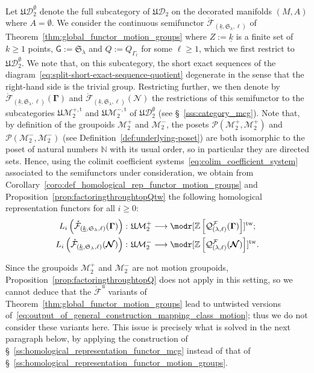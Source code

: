 \documentclass[AHL,Unicode,published]{cedram}
\newcommand{\Int}{\mathring}
\newcommand{\tw}{\mathrm{tw}}
\newcommand{\mt}{\mathrm{t}}
\newcommand{\unt}{\mathrm{u}}
\newcommand{\MCGo}{\mathbf{\Gamma}}
\newcommand{\MCGno}{\boldsymbol{\mathcal{N}}}
\newcommand{\LCS}{\varGamma}
\newcommand{\Sym}{\mathfrak{S}}
\newcommand{\fU}{\ensuremath{\mathfrak{U}}}
\newcommand{\sG}{\mathsf{G}}
\newcommand{\cD}{\mathcal{D}}
\newcommand{\cF}{\mathcal{F}}
\newcommand{\cM}{\mathcal{M}}
\newcommand{\cP}{\mathcal{P}}
\newcommand{\cQ}{\mathcal{Q}}
\newcommand{\bN}{\mathbb{N}}
\newcommand{\bZ}{\mathbb{Z}}
\newcommand{\too}{\ensuremath{\longrightarrow}}
\renewcommand{\geq}{\geqslant}
\begin{document}
Let $\fU\cD_{2}^{\emptyset}$ denote the full subcategory of $\fU\cD_{2}$ on the decorated manifolds $(M,A)$ where $A = \emptyset$. We consider the continuous semifunctor $\Int{\cF}_{(\underline{k},\Sym_{\lambda},\ell)}$ of Theorem~\ref{thm:global_functor_motion_groups} where $Z:=\underline{k}$ is a finite set of $k\geq 1$ points, $\sG:=\Sym_{\lambda}$ and $Q:=Q_{\LCS_{\ell}}$ for some $\ell\geq 1$, which we first restrict to $\fU\cD_{2}^{\emptyset}$. We note that, on this subcategory, the short exact sequences of the diagram~\eqref{eq:split-short-exact-sequence-quotient} degenerate in the sense that the right-hand side is the trivial group. Restricting further, we then denote by $\Int{\cF}_{(\underline{k},\Sym_{\lambda},\ell)}(\MCGo)$ and $\Int{\cF}_{(\underline{k},\Sym_{\lambda},\ell)}(\MCGno)$ the restrictions of this semifunctor to the subcategories $\fU\cM_{2}^{+,\mt}$ and $\fU\cM_{2}^{-,\mt}$ of $\fU\cD_{2}^{\emptyset}$ (see \S~\ref{sss:category_mcg}). Note that, by definition of the groupoids $\cM_{2}^{+}$ and $\cM_{2}^{-}$, the posets $\cP(\cM_{2}^{+},\cM_{2}^{+})$ and $\cP(\cM_{2}^{-},\cM_{2}^{-})$ (see Definition~\ref{def:underlying-poset}) are both isomorphic to the poset of natural numbers $\bN$ with its usual order, so in particular they are directed sets. Hence, using the colimit coefficient systems~\eqref{eq:colim_coefficient_system} associated to the semifunctors under consideration, we obtain from Corollary~\ref{coro:def_homological_rep_functor_motion_groups} and Proposition~\ref{prop:factoringthroughtopQtw} the following homological representation functors for all $i\geq 0$:
\begin{equation}\label{eq:output_of_general_construction_mapping_class_motion}
\begin{split}
L_{i}\left(\Int{\cF}_{\left(\underline{k},\Sym_{\lambda},\ell\right)}(\MCGo)\right) \colon \fU\cM_{2}^{+} &\too \modr[\bZ\left[\cQ^{\cF}_{(\lambda,\ell)}(\MCGo)\right]]^{\tw}; \\
L_{i}\left(\Int{\cF}_{\left(\underline{k},\Sym_{\lambda},\ell\right)}(\MCGno)\right) \colon \fU\cM_{2}^{-} &\too \modr[\bZ\left[\cQ^{\cF}_{(\lambda,\ell)}(\MCGno)\right]]^{\tw}.
\end{split}
\end{equation}

\begin{rema}\label{rmk:no-untwisted-versions}
Since the groupoids $\cM_{2}^{+}$ and $\cM_{2}^{-}$ are not motion groupoids, Proposition~\ref{prop:factoringthroughtopQ} does not apply in this setting, so we cannot deduce that the $\Int{\cF}^{\unt}$ variants of Theorem~\ref{thm:global_functor_motion_groups} lead to untwisted versions of~\eqref{eq:output_of_general_construction_mapping_class_motion}; thus we do not consider these variants here. This issue is precisely what is solved in the next paragraph below, by applying the construction of \S~\ref{ss:homological_representation_functor_mcg} instead of that of \S~\ref{ss:homological_representation_functor_motion_groups}.
\end{rema}
\end{document}
